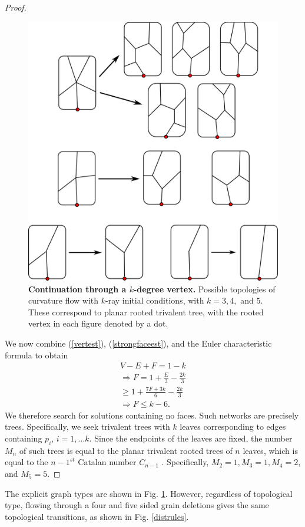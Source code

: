\begin{proof}
\begin{figure}
\begin{centering}
\includegraphics{graintrees.png}
\caption {\textbf{Continuation through a $k$-degree vertex. }\label{crittypes}Possible topologies of  curvature flow with $k$-ray initial conditions, with $k= 3, 4,$ and $5$. These correspond to planar rooted  trivalent tree, with the rooted vertex in each figure denoted by a dot.   } 
\end{centering}   
\end{figure}

We now combine (\ref{vertest}), (\ref{strongfaceest}), and the Euler characteristic formula to obtain
\begin{eqnarray}
V-E+F = 1-k \\
\Rightarrow F =1+\frac{E}3-\frac{2k}3\nonumber\\
\ge1+\frac{7F+3k}{6}-\frac{2k}3 \nonumber\\
\Rightarrow F\le k-6 \nonumber.
\end{eqnarray}
 We therefore search for solutions containing no faces.  Such networks are precisely trees.  Specifically, we seek trivalent trees with $k$ leaves corresponding to  edges containing $p_i$, $i = 1, \dots k$.  Since the endpoints of the leaves are fixed, the number $M_n$ of such trees is equal to the planar trivalent rooted trees of $n$ leaves, which is equal to the ${n-1}^{st}$ Catalan number $C_{n-1}$ \cite{hungerbuhler1995isomorphism}. Specifically, $M_2 = 1,M_3 = 1, M_4 = 2$, and $M_5 = 5$. 
\end{proof}
The explicit graph types are shown in Fig. \ref{crittypes}. However, regardless of topological type, flowing through a  four and five sided grain deletions gives the same topological transitions, as shown in Fig. \ref{distrules}. 


